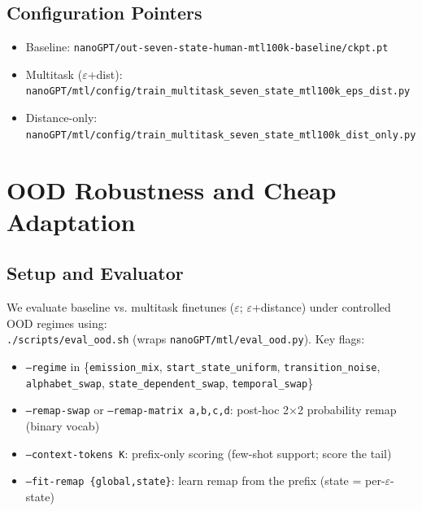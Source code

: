 \documentclass[11pt]{article}
\begin{document}
\subsection{Configuration Pointers}
\begin{itemize}
    \item Baseline: \texttt{nanoGPT/out-seven-state-human-mtl100k-baseline/ckpt.pt}
    \item Multitask ($\varepsilon$+dist): \texttt{nanoGPT/mtl/config/train\_multitask\_seven\_state\_mtl100k\_eps\_dist.py}
    \item Distance-only: \texttt{nanoGPT/mtl/config/train\_multitask\_seven\_state\_mtl100k\_dist\_only.py}
\end{itemize}

\section{OOD Robustness and Cheap Adaptation}

\subsection{Setup and Evaluator}
\begin{notebox}[Evaluator]
We evaluate baseline vs. multitask finetunes ($\varepsilon$; $\varepsilon$+distance) under controlled OOD regimes using:\\
\texttt{\small ./scripts/eval\_ood.sh} (wraps \texttt{nanoGPT/mtl/eval\_ood.py}). Key flags:
\begin{itemize}
  \item \texttt{--regime} in \{\texttt{emission\_mix}, \texttt{start\_state\_uniform}, \texttt{transition\_noise}, \texttt{alphabet\_swap}, \texttt{state\_dependent\_swap}, \texttt{temporal\_swap}\}
  \item \texttt{--remap-swap} or \texttt{--remap-matrix a,b,c,d}: post-hoc 2×2 probability remap (binary vocab)
  \item \texttt{--context-tokens K}: prefix-only scoring (few-shot support; score the tail)
  \item \texttt{--fit-remap \{global,state\}}: learn remap from the prefix (state = per-$\varepsilon$-state)
\end{itemize}
\end{notebox}
\end{document}
